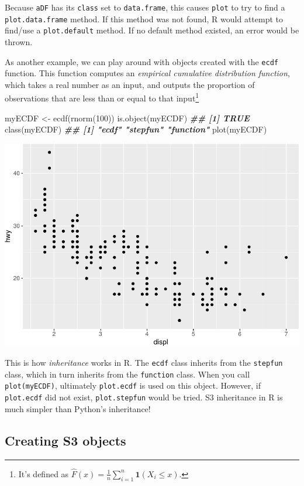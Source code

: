 \documentclass[
  12pt,
]{krantz}
\makeatletter
\newenvironment{Shaded}{\begin{snugshade}}{\end{snugshade}}
\newcommand{\DecValTok}[1]{\textcolor[rgb]{0.06,0.06,0.06}{#1}}
\newcommand{\DocumentationTok}[1]{\textcolor[rgb]{0.37,0.37,0.37}{\textbf{\textit{#1}}}}
\newcommand{\FunctionTok}[1]{\textcolor[rgb]{0,0,0}{#1}}
\newcommand{\NormalTok}[1]{#1}
\newcommand{\OtherTok}[1]{\textcolor[rgb]{0.37,0.37,0.37}{#1}}
\newenvironment{kframe}{%
\medskip{}
\setlength{\fboxsep}{.8em}
 \def\at@end@of@kframe{}%
 \ifinner\ifhmode%
  \def\at@end@of@kframe{\end{minipage}}%
  \begin{minipage}{\columnwidth}%
 \fi\fi%
 \def\FrameCommand##1{\hskip\@totalleftmargin \hskip-\fboxsep
 \colorbox{shadecolor}{##1}\hskip-\fboxsep
     \hskip-\linewidth \hskip-\@totalleftmargin \hskip\columnwidth}%
 \MakeFramed {\advance\hsize-\width
   \@totalleftmargin\z@ \linewidth\hsize
   \@setminipage}}%
 {\par\unskip\endMakeFramed%
 \at@end@of@kframe}
\renewenvironment{Shaded}{\begin{kframe}}{\end{kframe}}
\makeatother
\begin{document}
Because \texttt{aDF} has its \texttt{class} set to \texttt{data.frame}, this causes \texttt{plot} to try to find a \texttt{plot.data.frame} method. If this method was not found, R would attempt to find/use a \texttt{plot.default} method. If no default method existed, an error would be thrown.

As another example, we can play around with objects created with the \texttt{ecdf} function. This function computes an \emph{empirical cumulative distribution function}, which takes a real number as an input, and outputs the proportion of observations that are less than or equal to that input\footnote{It's defined as \(\hat{F}(x) = \frac{1}{n}\sum_{i=1}^n \mathbf{1}(X_i \le x)\).}

\begin{Shaded}
\begin{Highlighting}[]
\NormalTok{myECDF }\OtherTok{\textless{}{-}} \FunctionTok{ecdf}\NormalTok{(}\FunctionTok{rnorm}\NormalTok{(}\DecValTok{100}\NormalTok{))}
\FunctionTok{is.object}\NormalTok{(myECDF)}
\DocumentationTok{\#\# [1] TRUE}
\FunctionTok{class}\NormalTok{(myECDF)}
\DocumentationTok{\#\# [1] "ecdf"     "stepfun"  "function"}
\FunctionTok{plot}\NormalTok{(myECDF)}
\end{Highlighting}
\end{Shaded}

\includegraphics[width=0.5\linewidth]{r_and_python_book_files/figure-latex/unnamed-chunk-193-1}

This is how \emph{inheritance} works in R. The \texttt{ecdf} class inherits from the \texttt{stepfun} class, which in turn inherits from the \texttt{function} class. When you call \texttt{plot(myECDF)}, ultimately \texttt{plot.ecdf} is used on this object. However, if \texttt{plot.ecdf} did not exist, \texttt{plot.stepfun} would be tried. S3 inheritance in R is much simpler than Python's inheritance!

\hypertarget{creating-s3-objects}{%
\subsection{Creating S3 objects}\label{creating-s3-objects}}
\end{document}
